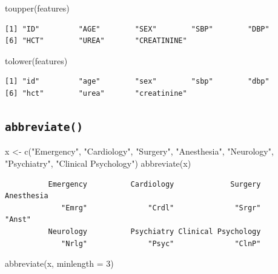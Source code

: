 \documentclass[
]{book}
\newenvironment{Shaded}{\begin{snugshade}}{\end{snugshade}}
\newcommand{\AttributeTok}[1]{\textcolor[rgb]{0.77,0.63,0.00}{#1}}
\newcommand{\DecValTok}[1]{\textcolor[rgb]{0.00,0.00,0.81}{#1}}
\newcommand{\FunctionTok}[1]{\textcolor[rgb]{0.00,0.00,0.00}{#1}}
\newcommand{\NormalTok}[1]{#1}
\newcommand{\OtherTok}[1]{\textcolor[rgb]{0.56,0.35,0.01}{#1}}
\newcommand{\StringTok}[1]{\textcolor[rgb]{0.31,0.60,0.02}{#1}}
\begin{document}
\begin{Shaded}
\begin{Highlighting}[]
\FunctionTok{toupper}\NormalTok{(features)}
\end{Highlighting}
\end{Shaded}

\begin{verbatim}
[1] "ID"         "AGE"        "SEX"        "SBP"        "DBP"       
[6] "HCT"        "UREA"       "CREATININE"
\end{verbatim}

\begin{Shaded}
\begin{Highlighting}[]
\FunctionTok{tolower}\NormalTok{(features)}
\end{Highlighting}
\end{Shaded}

\begin{verbatim}
[1] "id"         "age"        "sex"        "sbp"        "dbp"       
[6] "hct"        "urea"       "creatinine"
\end{verbatim}

\hypertarget{abbreviate}{%
\subsection{\texorpdfstring{\texttt{abbreviate()}}{abbreviate()}}\label{abbreviate}}

\begin{Shaded}
\begin{Highlighting}[]
\NormalTok{x }\OtherTok{\textless{}{-}} \FunctionTok{c}\NormalTok{(}\StringTok{"Emergency"}\NormalTok{, }\StringTok{"Cardiology"}\NormalTok{, }\StringTok{"Surgery"}\NormalTok{, }\StringTok{"Anesthesia"}\NormalTok{, }\StringTok{"Neurology"}\NormalTok{, }\StringTok{"Psychiatry"}\NormalTok{, }\StringTok{"Clinical Psychology"}\NormalTok{)}
\FunctionTok{abbreviate}\NormalTok{(x)}
\end{Highlighting}
\end{Shaded}

\begin{verbatim}
          Emergency          Cardiology             Surgery          Anesthesia 
             "Emrg"              "Crdl"              "Srgr"              "Anst" 
          Neurology          Psychiatry Clinical Psychology 
             "Nrlg"              "Psyc"              "ClnP" 
\end{verbatim}

\begin{Shaded}
\begin{Highlighting}[]
\FunctionTok{abbreviate}\NormalTok{(x, }\AttributeTok{minlength =} \DecValTok{3}\NormalTok{)}
\end{Highlighting}
\end{Shaded}
\end{document}
